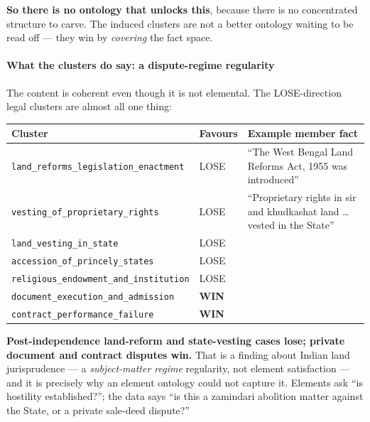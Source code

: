 \documentclass[12pt,a4paper]{article}
\newcommand{\code}[1]{\texttt{\small #1}}
\begin{document}
\textbf{So there is no ontology that unlocks this}, because there is no concentrated structure to
carve. The induced clusters are not a better ontology waiting to be read off --- they win by
\emph{covering} the fact space.

\paragraph{What the clusters do say: a dispute-regime regularity} The content is coherent even though
it is not elemental. The LOSE-direction legal clusters are almost all one thing:

\begin{center}
\begin{tabular}{@{}llp{6.4cm}@{}}
\toprule
\textbf{Cluster} & \textbf{Favours} & \textbf{Example member fact} \\
\midrule
\code{land\_reforms\_legislation\_enactment} & LOSE & ``The West Bengal Land Reforms Act, 1955 was introduced'' \\
\code{vesting\_of\_proprietary\_rights} & LOSE & ``Proprietary rights in sir and khudkashat land \ldots{} vested in the State'' \\
\code{land\_vesting\_in\_state} & LOSE & \\
\code{accession\_of\_princely\_states} & LOSE & \\
\code{religious\_endowment\_and\_institution} & LOSE & \\
\code{document\_execution\_and\_admission} & \textbf{WIN} & \\
\code{contract\_performance\_failure} & \textbf{WIN} & \\
\bottomrule
\end{tabular}
\end{center}

\textbf{Post-independence land-reform and state-vesting cases lose; private document and contract
disputes win.} That is a finding about Indian land jurisprudence --- a \emph{subject-matter regime}
regularity, not element satisfaction --- and it is precisely why an element ontology could not
capture it. Elements ask ``is hostility established?''; the data says ``is this a zamindari abolition
matter against the State, or a private sale-deed dispute?''
\end{document}
